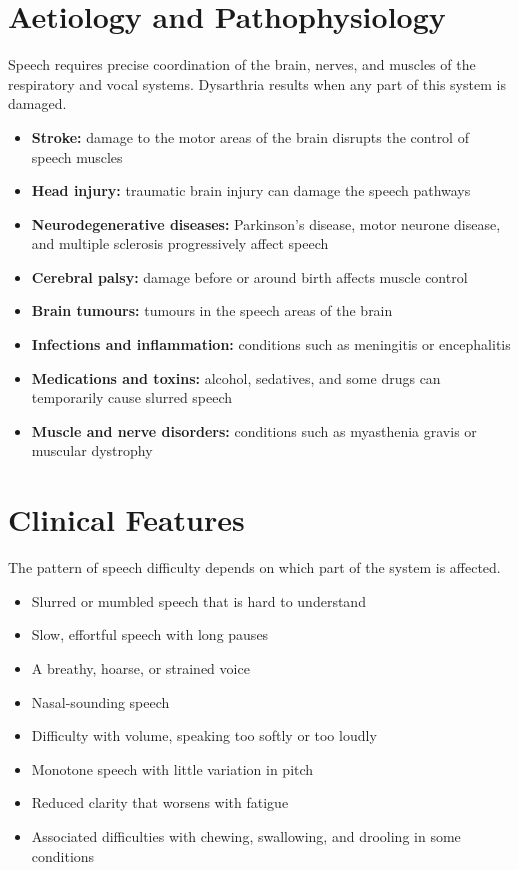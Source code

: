 \section*{Aetiology and Pathophysiology}
Speech requires precise coordination of the brain, nerves, and muscles of the respiratory and vocal systems. Dysarthria results when any part of this system is damaged.
\begin{itemize}
    \item \textbf{Stroke:} damage to the motor areas of the brain disrupts the control of speech muscles
    \item \textbf{Head injury:} traumatic brain injury can damage the speech pathways
    \item \textbf{Neurodegenerative diseases:} Parkinson's disease, motor neurone disease, and multiple sclerosis progressively affect speech
    \item \textbf{Cerebral palsy:} damage before or around birth affects muscle control
    \item \textbf{Brain tumours:} tumours in the speech areas of the brain
    \item \textbf{Infections and inflammation:} conditions such as meningitis or encephalitis
    \item \textbf{Medications and toxins:} alcohol, sedatives, and some drugs can temporarily cause slurred speech
    \item \textbf{Muscle and nerve disorders:} conditions such as myasthenia gravis or muscular dystrophy
\end{itemize}

\section*{Clinical Features}
The pattern of speech difficulty depends on which part of the system is affected.
\begin{itemize}
    \item Slurred or mumbled speech that is hard to understand
    \item Slow, effortful speech with long pauses
    \item A breathy, hoarse, or strained voice
    \item Nasal-sounding speech
    \item Difficulty with volume, speaking too softly or too loudly
    \item Monotone speech with little variation in pitch
    \item Reduced clarity that worsens with fatigue
    \item Associated difficulties with chewing, swallowing, and drooling in some conditions
\end{itemize}

